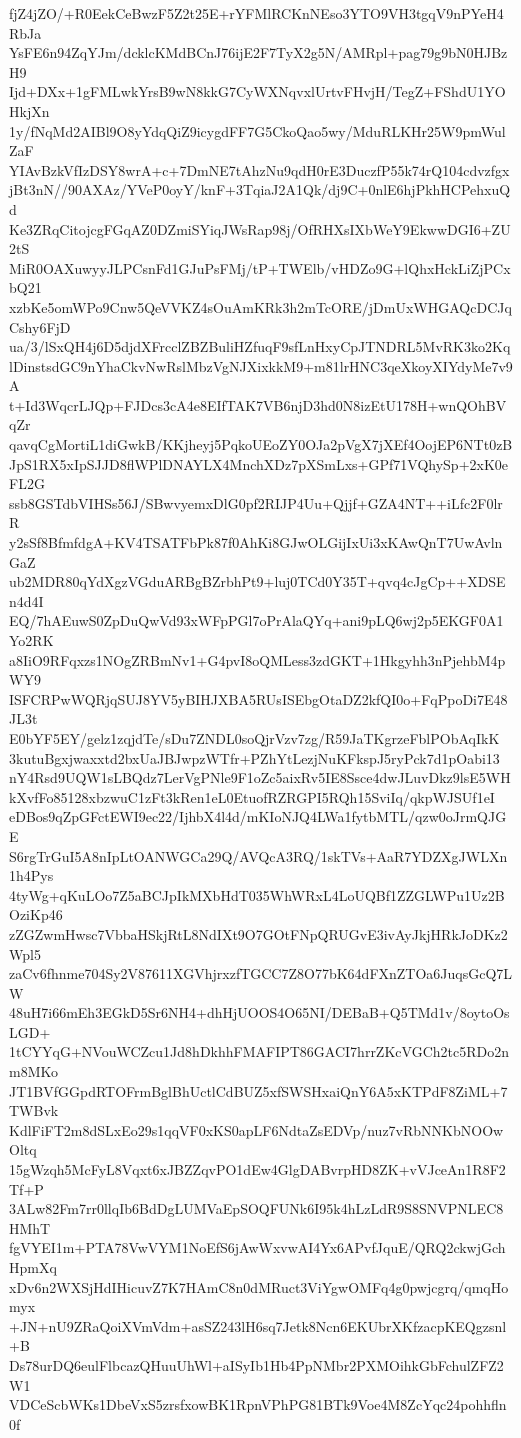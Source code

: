 fjZ4jZO/+R0EekCeBwzF5Z2t25E+rYFMlRCKnNEso3YTO9VH3tgqV9nPYeH4RbJa
YsFE6n94ZqYJm/dcklcKMdBCnJ76ijE2F7TyX2g5N/AMRpl+pag79g9bN0HJBzH9
Ijd+DXx+1gFMLwkYrsB9wN8kkG7CyWXNqvxlUrtvFHvjH/TegZ+FShdU1YOHkjXn
1y/fNqMd2AIBl9O8yYdqQiZ9icygdFF7G5CkoQao5wy/MduRLKHr25W9pmWulZaF
YIAvBzkVfIzDSY8wrA+c+7DmNE7tAhzNu9qdH0rE3DuczfP55k74rQ104cdvzfgx
jBt3nN//90AXAz/YVeP0oyY/knF+3TqiaJ2A1Qk/dj9C+0nlE6hjPkhHCPehxuQd
Ke3ZRqCitojcgFGqAZ0DZmiSYiqJWsRap98j/OfRHXsIXbWeY9EkwwDGI6+ZU2tS
MiR0OAXuwyyJLPCsnFd1GJuPsFMj/tP+TWElb/vHDZo9G+lQhxHckLiZjPCxbQ21
xzbKe5omWPo9Cnw5QeVVKZ4sOuAmKRk3h2mTcORE/jDmUxWHGAQcDCJqCshy6FjD
ua/3/lSxQH4j6D5djdXFrcclZBZBuliHZfuqF9sfLnHxyCpJTNDRL5MvRK3ko2Kq
lDinstsdGC9nYhaCkvNwRslMbzVgNJXixkkM9+m81lrHNC3qeXkoyXIYdyMe7v9A
t+Id3WqcrLJQp+FJDcs3cA4e8EIfTAK7VB6njD3hd0N8izEtU178H+wnQOhBVqZr
qavqCgMortiL1diGwkB/KKjheyj5PqkoUEoZY0OJa2pVgX7jXEf4OojEP6NTt0zB
JpS1RX5xIpSJJD8flWPlDNAYLX4MnchXDz7pXSmLxs+GPf71VQhySp+2xK0eFL2G
ssb8GSTdbVIHSs56J/SBwvyemxDlG0pf2RIJP4Uu+Qjjf+GZA4NT++iLfc2F0lrR
y2sSf8BfmfdgA+KV4TSATFbPk87f0AhKi8GJwOLGijIxUi3xKAwQnT7UwAvlnGaZ
ub2MDR80qYdXgzVGduARBgBZrbhPt9+luj0TCd0Y35T+qvq4cJgCp++XDSEn4d4I
EQ/7hAEuwS0ZpDuQwVd93xWFpPGl7oPrAlaQYq+ani9pLQ6wj2p5EKGF0A1Yo2RK
a8IiO9RFqxzs1NOgZRBmNv1+G4pvI8oQMLess3zdGKT+1Hkgyhh3nPjehbM4pWY9
ISFCRPwWQRjqSUJ8YV5yBIHJXBA5RUsISEbgOtaDZ2kfQI0o+FqPpoDi7E48JL3t
E0bYF5EY/gelz1zqjdTe/sDu7ZNDL0soQjrVzv7zg/R59JaTKgrzeFblPObAqIkK
3kutuBgxjwaxxtd2bxUaJBJwpzWTfr+PZhYtLezjNuKFkspJ5ryPck7d1pOabi13
nY4Rsd9UQW1sLBQdz7LerVgPNle9F1oZc5aixRv5IE8Ssce4dwJLuvDkz9lsE5WH
kXvfFo85128xbzwuC1zFt3kRen1eL0EtuofRZRGPI5RQh15SviIq/qkpWJSUf1eI
eDBos9qZpGFctEWI9ec22/IjhbX4l4d/mKIoNJQ4LWa1fytbMTL/qzw0oJrmQJGE
S6rgTrGuI5A8nIpLtOANWGCa29Q/AVQcA3RQ/1skTVs+AaR7YDZXgJWLXn1h4Pys
4tyWg+qKuLOo7Z5aBCJpIkMXbHdT035WhWRxL4LoUQBf1ZZGLWPu1Uz2BOziKp46
zZGZwmHwsc7VbbaHSkjRtL8NdIXt9O7GOtFNpQRUGvE3ivAyJkjHRkJoDKz2Wpl5
zaCv6fhnme704Sy2V87611XGVhjrxzfTGCC7Z8O77bK64dFXnZTOa6JuqsGcQ7LW
48uH7i66mEh3EGkD5Sr6NH4+dhHjUOOS4O65NI/DEBaB+Q5TMd1v/8oytoOsLGD+
1tCYYqG+NVouWCZcu1Jd8hDkhhFMAFIPT86GACI7hrrZKcVGCh2tc5RDo2nm8MKo
JT1BVfGGpdRTOFrmBglBhUctlCdBUZ5xfSWSHxaiQnY6A5xKTPdF8ZiML+7TWBvk
KdlFiFT2m8dSLxEo29s1qqVF0xKS0apLF6NdtaZsEDVp/nuz7vRbNNKbNOOwOltq
15gWzqh5McFyL8Vqxt6xJBZZqvPO1dEw4GlgDABvrpHD8ZK+vVJceAn1R8F2Tf+P
3ALw82Fm7rr0llqIb6BdDgLUMVaEpSOQFUNk6I95k4hLzLdR9S8SNVPNLEC8HMhT
fgVYEI1m+PTA78VwVYM1NoEfS6jAwWxvwAI4Yx6APvfJquE/QRQ2ckwjGchHpmXq
xDv6n2WXSjHdIHicuvZ7K7HAmC8n0dMRuct3ViYgwOMFq4g0pwjcgrq/qmqHomyx
+JN+nU9ZRaQoiXVmVdm+asSZ243lH6sq7Jetk8Ncn6EKUbrXKfzacpKEQgzsnl+B
Ds78urDQ6eulFlbcazQHuuUhWl+aISyIb1Hb4PpNMbr2PXMOihkGbFchulZFZ2W1
VDCeScbWKs1DbeVxS5zrsfxowBK1RpnVPhPG81BTk9Voe4M8ZcYqc24pohhfln0f
